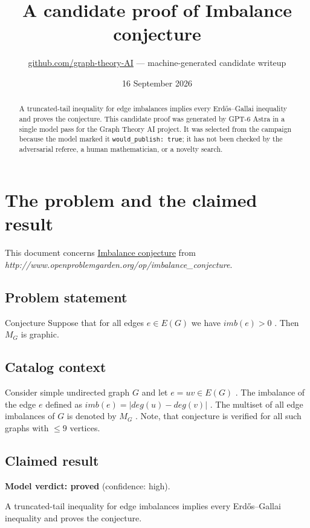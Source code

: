 \documentclass[
  11pt,
  a4paper,
]{article}
\title{A candidate proof of Imbalance conjecture}
\author{\href{https://github.com/graph-theory-AI}{github.com/graph-theory-AI}
--- machine-generated candidate writeup}
\date{16 September 2026}
\begin{document}
\maketitle
\begin{abstract}
A truncated-tail inequality for edge imbalances implies every
Erdős--Gallai inequality and proves the conjecture. This candidate proof
was generated by GPT-6 Astra in a single model pass for the Graph Theory
AI project. It was selected from the campaign because the model marked
it \texttt{would\_publish:\ true}; it has not been checked by the
adversarial referee, a human mathematician, or a novelty search.
\end{abstract}

\section{The problem and the claimed
result}\label{the-problem-and-the-claimed-result}

This document concerns
\href{https://graph-theory-ai.github.io/graph-conjectures/op/imbalance_conjecture/}{Imbalance
conjecture} from
\emph{http://www.openproblemgarden.org/op/imbalance\_conjecture}.

\subsection{Problem statement}\label{problem-statement}

Conjecture Suppose that for all edges \(e\in E(G)\) we have \(imb(e)>0\)
. Then \(M_{G}\) is graphic.

\subsection{Catalog context}\label{catalog-context}

Consider simple undirected graph \(G\) and let \(e=uv\in E(G)\) . The
imbalance of the edge \(e\) defined as \(imb(e)=|deg(u)-deg(v)|\) . The
multiset of all edge imbalances of \(G\) is denoted by \(M_{G}\) . Note,
that conjecture is verified for all such graphs with \(\leq 9\)
vertices.

\subsection{Claimed result}\label{claimed-result}

\textbf{Model verdict: proved} (confidence: high).

A truncated-tail inequality for edge imbalances implies every
Erdős--Gallai inequality and proves the conjecture.
\end{document}

